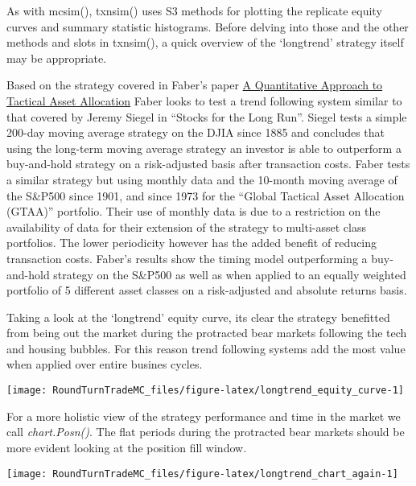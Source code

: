 As with mcsim(), txnsim() uses S3 methods for plotting the replicate
equity curves and summary statistic histograms. Before delving into
those and the other methods and slots in txnsim(), a quick overview of
the `longtrend' strategy itself may be appropriate.

Based on the strategy covered in Faber's paper
\href{https://papers.ssrn.com/sol3/papers.cfm?abstract_id=962461}{A
Quantitative Approach to Tactical Asset Allocation} Faber looks to test
a trend following system similar to that covered by Jeremy Siegel in
``Stocks for the Long Run''. Siegel tests a simple 200-day moving
average strategy on the DJIA since 1885 and concludes that using the
long-term moving average strategy an investor is able to outperform a
buy-and-hold strategy on a risk-adjusted basis after transaction costs.
Faber tests a similar strategy but using monthly data and the 10-month
moving average of the S\&P500 since 1901, and since 1973 for the
``Global Tactical Asset Allocation (GTAA)'' portfolio. Their use of
monthly data is due to a restriction on the availability of data for
their extension of the strategy to multi-asset class portfolios. The
lower periodicity however has the added benefit of reducing transaction
costs. Faber's results show the timing model outperforming a
buy-and-hold strategy on the S\&P500 as well as when applied to an
equally weighted portfolio of 5 different asset classes on a
risk-adjusted and absolute returns basis.

Taking a look at the `longtrend' equity curve, its clear the strategy
benefitted from being out the market during the protracted bear markets
following the tech and housing bubbles. For this reason trend following
systems add the most value when applied over entire busines cycles.

\begin{Schunk}


\begin{center}\texttt{[image: RoundTurnTradeMC\_files/figure-latex/longtrend\_equity\_curve-1]} \end{center}

\end{Schunk}

For a more holistic view of the strategy performance and time in the
market we call \emph{chart.Posn()}. The flat periods during the
protracted bear markets should be more evident looking at the position
fill window.

\begin{Schunk}


\begin{center}\texttt{[image: RoundTurnTradeMC\_files/figure-latex/longtrend\_chart\_again-1]} \end{center}

\end{Schunk}

